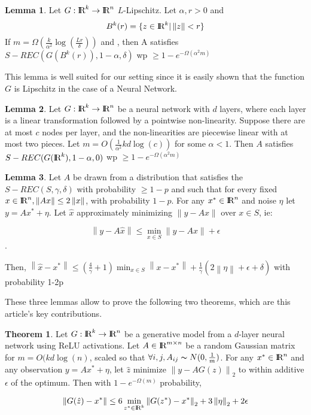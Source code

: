 \documentclass{article}
\newcommand\norm[1]{\left\lVert#1\right\rVert}
\def\R{\textrm{I\kern-0.21emR}}
\theoremstyle{definition}
\theoremstyle{lemma}
\newtheorem{lemma}{Lemma}[section]
\theoremstyle{theorem}
\newtheorem{theorem}{Theorem}[section]
\begin{document}
\begin{lemma}
Let $G : \R^k \rightarrow \R^n$ $L$-Lipschitz. Let $\alpha, r > 0$ and $$B^k(r) = \{ z \in \R^k | \norm{z} < r \}$$
If $m = \Omega(\frac{k}{\alpha^2} \log(\frac{Lr}{\delta}))$ and , then A satisfies $S-REC(G(B^k(r)), 1-\alpha, \delta)$ wp  $ \geq 1 - e^{- \Omega(\alpha^2 m)}$  
\end{lemma}

This lemma is well suited for our setting since it is easily shown that the function $G$ is Lipschitz in the case of a Neural Network.


\begin{lemma}
Let $G : \R^k \rightarrow \R^n$ be a neural network with $d$ layers, where each layer is a linear transformation followed by a pointwise non-linearity. Suppose there are at most $c$ nodes per layer, and the non-linearities are piecewise linear with at most two pieces. Let $m = O(\frac{1}{\alpha^2} kd \log(c))$ for some $\alpha <1$. Then $A$ satisfies $S-REC(G(\R^k), 1-\alpha, 0)$ wp  $ \geq 1 - e^{- \Omega(\alpha^2 m)}$  

\end{lemma}


\begin{lemma}
Let $A$ be drawn from a distribution that satisfies the $S-REC(S,\gamma, \delta)$ with probability $\geq 1-p$ and such that for every fixed $x \in \R^n, \norm{Ax} \leq 2 \norm{x}$, with probability $1-p$. For any $x^* \in \R^n$ and noise $\eta$ let $y = Ax^* + \eta$. Let $\hat{x}$ approximately minimizing $\norm{y - Ax}$ over $x \in S$, ie:

$$ \norm{y - A\hat{x} } \leq \min_{x  \in S} \norm{y - Ax} + \epsilon$$.

Then, $\norm{\hat{x} - x^*} \leq (\frac{4}{\gamma} +1) \min_{x \in S} \norm{x - x^*} + \frac{1}{\gamma}(2\norm{\eta} + \epsilon + \delta)$ with probability 1-2p
\end{lemma}

These three lemmas allow to prove the following two theorems, which are this article's key contributions.

\begin{theorem}
Let $G : \R^k \rightarrow \R^n$ be a generative model from a $d$-layer neural network using ReLU activations. Let $A \in \R^{m \times n}$ be a random Gaussian matrix for $m = O(kd \log(n)$, scaled so that $\forall i,j, A_{ij} \thicksim N(0, \frac{1}{m})$. For any $x^* \in \R^n$ and any observation $y = Ax^* + \eta$, let $\hat{z}$ minimize $\norm{y - AG(z)}_2$ to within additive $\epsilon$  of the optimum. Then with $1-e^{-\Omega(m)}$ probability, 

$$ \norm{G(\hat{z}) - x^*} \leq 6 \min_{z^* \in \R^k} \norm{G(z^*) - x^*}_2 +3\norm{\eta}_2 + 2\epsilon$$
\end{theorem}
\end{document}
